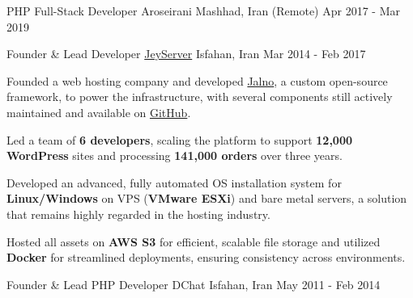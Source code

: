 \begin{cventries}
  \cventry
    {PHP Full-Stack Developer} %
    {Aroseirani} %
    {Mashhad, Iran (Remote)} %
    {Apr 2017 - Mar 2019} %
    {}

  \cventry
    {Founder \& Lead Developer} %
    {\href{https://jeyserver.com}{JeyServer}} %
    {Isfahan, Iran} %
    {Mar 2014 - Feb 2017} %
    {
      \begin{cvitems}
        \item {Founded a web hosting company and developed \href{https://jalno.ir/en/}{Jalno}, a custom open-source framework, to power the infrastructure, with several components still actively maintained and available on \href{https://github.com/jeyserver}{GitHub}.}
        \item {Led a team of \textbf{6 developers}, scaling the platform to support \textbf{12,000 WordPress} sites and processing \textbf{141,000 orders} over three years.}
        \item {Developed an advanced, fully automated OS installation system for \textbf{Linux/Windows} on VPS (\textbf{VMware ESXi}) and bare metal servers, a solution that remains highly regarded in the hosting industry.}
        \item {Hosted all assets on \textbf{AWS S3} for efficient, scalable file storage and utilized \textbf{Docker} for streamlined deployments, ensuring consistency across environments.}
      \end{cvitems}
    }
  
  \cventry
    {Founder \& Lead PHP Developer} %
    {DChat} %
    {Isfahan, Iran} %
    {May 2011 - Feb 2014} %
    {}

\end{cventries}
